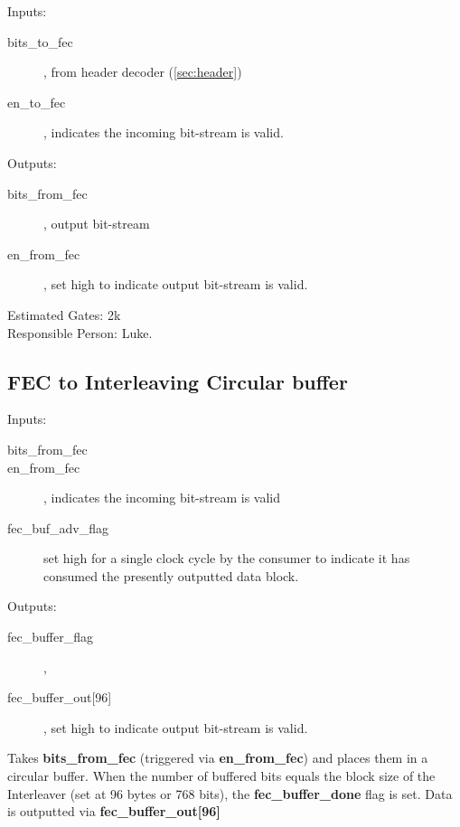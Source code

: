 \documentclass[dvips,10pt,twocolumn]{article}
\begin{document}
	\begin{description}
		\item{Inputs:} \begin{description}
			\item[bits\_to\_fec], from header decoder
				(\autoref{sec:header})
			\item[en\_to\_fec], indicates the incoming
				bit-stream is valid.
		\end{description}
		\item{Outputs:} \begin{description}
			\item[bits\_from\_fec], output bit-stream
			\item[en\_from\_fec], set high to indicate
				output bit-stream is valid.
		\end{description}
	\end{description}

	Estimated Gates: 2k \\
	Responsible Person: Luke.

	\subsection{FEC to Interleaving Circular buffer}
	\label{sec:fec_buffer}

	\begin{description}
		\item{Inputs:} \begin{description}
			\item[bits\_from\_fec]
			\item[en\_from\_fec], indicates the incoming
				bit-stream is valid
			\item[fec\_buf\_adv\_flag] set high for a
				single clock cycle by the consumer to
				indicate it has consumed the
				presently outputted data block.
		\end{description}
		\item{Outputs:} \begin{description}
			\item[fec\_buffer\_flag], 
			\item[fec\_buffer\_out{[96]}], set high to indicate
				output bit-stream is valid.
		\end{description}
	\end{description}

	Takes \textbf{bits\_from\_fec} (triggered via
	\textbf{en\_from\_fec}) and places them in a circular
	buffer. When the number of buffered bits equals the block
	size of the Interleaver (set at 96 bytes or 768 bits), the
	\textbf{fec\_buffer\_done} flag is set. Data is outputted
	via \textbf{fec\_buffer\_out[96]}
\end{document}
